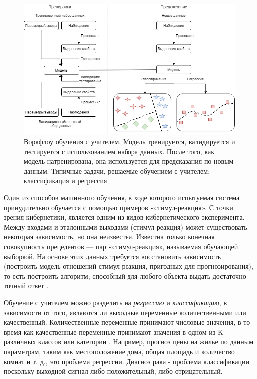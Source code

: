 \begin{figure}[ht!]
	\center
	\includegraphics [scale=0.60] {my_folder/images/ch1/supervised-learning.png}
	\caption{Воркфлоу обучения с учителем. Модель тренируется, валидируется и тестируется с использованием набора данных. После того, как модель натренирована, она используется для предсказания по новым данным. Типичные задачи, решаемые обучением с учителем: классификация и регрессия}
	\label{fig:supervised-learning}
\end{figure}

Один из способов машинного обучения, в ходе которого испытуемая система принудительно обучается с помощью примеров «стимул-реакция». С точки зрения кибернетики, является одним из видов кибернетического эксперимента. Между входами и эталонными выходами (стимул-реакция) может существовать некоторая зависимость, но она неизвестна. Известна только конечная совокупность прецедентов — пар «стимул-реакция», называемая обучающей выборкой. На основе этих данных требуется восстановить зависимость (построить модель отношений стимул-реакция, пригодных для прогнозирования), то есть построить алгоритм, способный для любого объекта выдать достаточно точный ответ \cite{james2014introduction}.

Обучение с учителем можно разделить на \textit{регрессию} и \textit{классификацию}, в зависимости от того, являются ли выходные переменные количественными или качественный. Количественные переменные принимают числовые значения, в то время как качественные переменные принимают значения в одном из K различных классов или категории \cite{james2014introduction}. Например, прогноз цены на жилье по данным параметрам, таким как местоположение дома, общая площадь и количество комнат и т. д., это проблема регрессии. Диагноз рака - проблема классификации поскольку выходной сигнал либо положительный, либо отрицательный.

